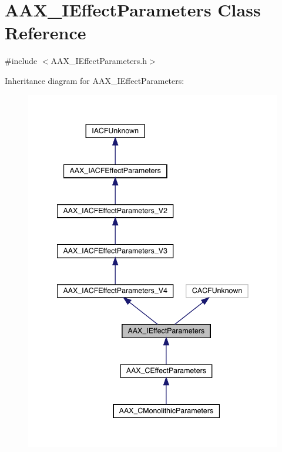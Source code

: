 \hypertarget{a01825}{}\section{A\+A\+X\+\_\+\+I\+Effect\+Parameters Class Reference}
\label{a01825}


{\ttfamily \#include $<$A\+A\+X\+\_\+\+I\+Effect\+Parameters.\+h$>$}



Inheritance diagram for A\+A\+X\+\_\+\+I\+Effect\+Parameters\+:
\nopagebreak
\begin{figure}[H]
\begin{center}
\leavevmode
\includegraphics[width=342pt]{a01824}
\end{center}
\end{figure}


